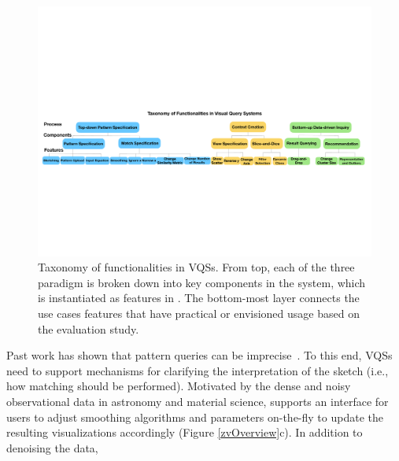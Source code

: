\begin{figure}[ht!]
  \centering
  \includegraphics[width=\linewidth]{figures/full_taxonomy_invert.pdf}
  \caption{Taxonomy of functionalities in VQSs. From top, each of the three paradigm is broken down into key components in the system, which is instantiated as features in \zvpp. The bottom-most layer connects the use cases features that have practical or envisioned usage based on the evaluation study.}
  \label{fig:taxonomy}
\end{figure}
Past work has shown that pattern queries 
can be imprecise~\cite{correll2016semantics,Holz2009,Eichmann2015}. 
To this end, VQSs need to support mechanisms for 
clarifying the interpretation of the sketch 
(i.e., how matching should be performed). 
Motivated by the dense and noisy observational data 
in astronomy and material science, 
\zvpp supports an interface for users to 
adjust smoothing algorithms and parameters on-the-fly 
to update the resulting visualizations accordingly (Figure \ref{zvOverview}c). 
In addition to denoising the data, 
